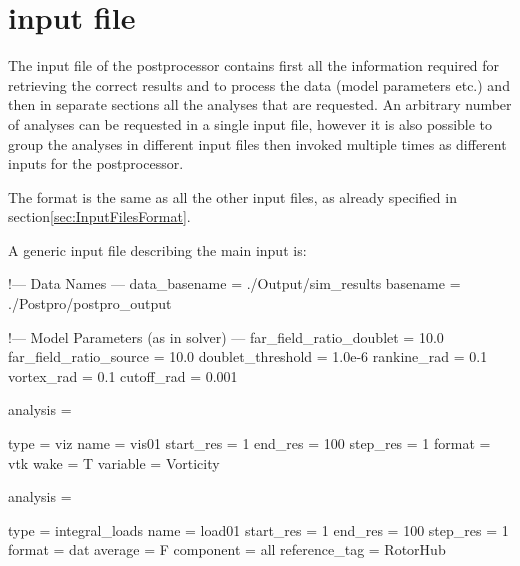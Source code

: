 \section{input file}
\label{sec:Post_InputFile}

The input file of the postprocessor contains first all the information required for retrieving the correct results and to process the data (model parameters etc.) and then in separate sections all the analyses that are requested. An arbitrary number of analyses can be requested in a single input file, however it is also possible to group the analyses in different input files then invoked multiple times as different inputs for the postprocessor. 

The format is the same as all the other input files, as already specified in section\ref{sec:InputFilesFormat}.

A generic input file describing the main input is:

\begin{inputfile}[frame=single, caption={dust\_post.in}, label={file:dust_post.in}]
!--- Data Names ---
data_basename = ./Output/sim_results
basename =     ./Postpro/postpro_output

!--- Model Parameters (as in solver) ---
far_field_ratio_doublet = 10.0
far_field_ratio_source = 10.0
doublet_threshold = 1.0e-6
rankine_rad = 0.1
vortex_rad = 0.1
cutoff_rad = 0.001

analysis = {

type = viz  
name = vis01
start_res = 1
end_res   = 100 
step_res  = 1
format = vtk
wake = T
variable = Vorticity 
}

analysis = {

type = integral_loads
name = load01
start_res = 1
end_res   = 100 
step_res  = 1
format = dat
average = F
component = all
reference_tag = RotorHub
}

\end{inputfile}

